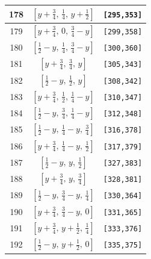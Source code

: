 \documentclass[fleqn,8pt]{jsarticle}
\begin{document}
\begin{longtable}{ccc}
178 & $\left[ y + \frac{3}{4},\, \frac{1}{4},\, y + \frac{1}{2} \right]$ & {\tt [295,353]} \\ \hline
179 & $\left[ y + \frac{3}{4},\, 0,\, \frac{3}{4} - y \right]$ & {\tt [299,358]} \\ \hline
180 & $\left[ \frac{1}{2} - y,\, \frac{1}{4},\, \frac{3}{4} - y \right]$ & {\tt [300,360]} \\ \hline
181 & $\left[ y + \frac{3}{4},\, \frac{3}{4},\, y \right]$ & {\tt [305,343]} \\ \hline
182 & $\left[ \frac{1}{2} - y,\, \frac{1}{2},\, y \right]$ & {\tt [308,342]} \\ \hline
183 & $\left[ y + \frac{3}{4},\, \frac{1}{2},\, \frac{1}{4} - y \right]$ & {\tt [310,347]} \\ \hline
184 & $\left[ \frac{1}{2} - y,\, \frac{3}{4},\, \frac{1}{4} - y \right]$ & {\tt [312,348]} \\ \hline
185 & $\left[ \frac{1}{2} - y,\, \frac{1}{4} - y,\, \frac{3}{4} \right]$ & {\tt [316,378]} \\ \hline
186 & $\left[ y + \frac{3}{4},\, \frac{1}{4} - y,\, \frac{1}{2} \right]$ & {\tt [317,379]} \\ \hline
187 & $\left[ \frac{1}{2} - y,\, y,\, \frac{1}{2} \right]$ & {\tt [327,383]} \\ \hline
188 & $\left[ y + \frac{3}{4},\, y,\, \frac{3}{4} \right]$ & {\tt [328,381]} \\ \hline
189 & $\left[ \frac{1}{2} - y,\, \frac{3}{4} - y,\, \frac{1}{4} \right]$ & {\tt [330,364]} \\ \hline
190 & $\left[ y + \frac{3}{4},\, \frac{3}{4} - y,\, 0 \right]$ & {\tt [331,365]} \\ \hline
191 & $\left[ y + \frac{3}{4},\, y + \frac{1}{2},\, \frac{1}{4} \right]$ & {\tt [333,376]} \\ \hline
192 & $\left[ \frac{1}{2} - y,\, y + \frac{1}{2},\, 0 \right]$ & {\tt [335,375]} \\
\end{longtable}
\renewcommand{\arraystretch}{1.2}
\end{document}
